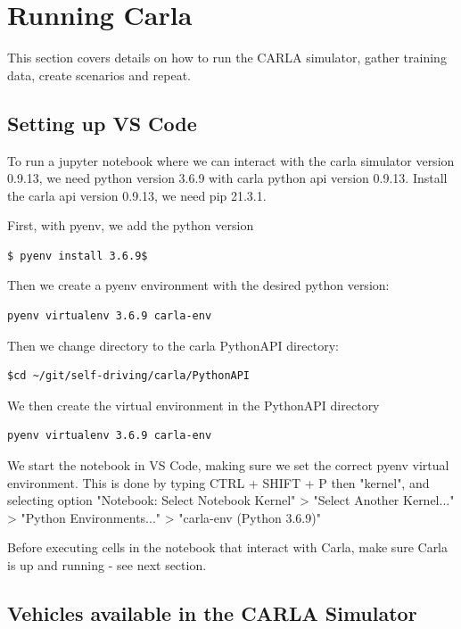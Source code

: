 \section{Running Carla}

This section covers details on how to run the CARLA simulator, gather training data, create scenarios and repeat.

\subsection{Setting up VS Code}
To run a jupyter notebook where we can interact with the carla simulator version 0.9.13, we need python version 3.6.9 with carla python api version 0.9.13. Install the carla api version 0.9.13, we need pip 21.3.1.

First, with pyenv, we add the python version
\begin{verbatim}
$ pyenv install 3.6.9$  
\end{verbatim}

Then we create a pyenv environment with the desired python version:
\begin{verbatim}
pyenv virtualenv 3.6.9 carla-env
\end{verbatim}

Then we change directory to the carla PythonAPI directory:
\begin{verbatim}
$cd ~/git/self-driving/carla/PythonAPI
\end{verbatim}
We then create the virtual environment in the PythonAPI directory
\begin{verbatim}
pyenv virtualenv 3.6.9 carla-env
\end{verbatim}

We start the notebook in VS Code, making sure we set the correct pyenv virtual environment. This is done by typing CTRL + SHIFT + P then "kernel", and selecting option "Notebook: Select Notebook Kernel" > "Select Another Kernel..." > "Python Environments..." > "carla-env (Python 3.6.9)"

Before executing cells in the notebook that interact with Carla, make sure Carla is up and running - see next section.

\subsection{Vehicles available in the CARLA Simulator}

